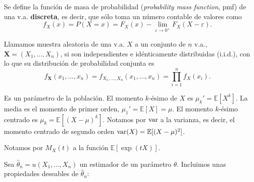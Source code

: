 \begin{definicion}
	Se define la función de masa de probabilidad  
(\textit{probability mass function}, pmf) de una v.a. 
\textbf{discreta}, es decir, que sólo toma un número contable 
de valores como
	\[ 
		f_X(x) = P(X=x) = 
		F_X(x) - 
			\lim_{\varepsilon \rightarrow 0^+} 
				F_X(X-\varepsilon).
	\]
\end{definicion}

\begin{definicion}
	Llamamos muestra aleatoria de una v.a. $X$ a un conjunto 
de $n$ v.a., $\mathbf{X} = (X_1, \dots, X_n)$, si son independientes e 
idénticamente distribuidas (i.i.d.), con lo que su 
distribución de probabilidad conjunta es
	\[ 
		f_{\mathbf{X}}(x_1, \dots, x_n) =
		f_{X_1, \dots, X_n}(x_1, \dots, x_n) =
		\prod\limits_{i=1}^n f_X(x_i).
	\]
\end{definicion}
	
\begin{definicion}[Momento]
	Es un parámetro de la población. El momento $k$-ésimo de 
$X$ es $\mu_k' = \mathbb{E}[X^k]$. La media es el momento de 
primer orden, $\mu_1' = \mathbb{E}[X] = \mu$. El momento 
$k$-ésimo centrado es  $\mu_k = \mathbb{E}[(X - \mu)^k]$.
Notamos por $\text{var}$ a la varianza, es decir, el momento 
centrado de segundo orden $\text{var}(X) = \mathbb{E}[(X - \mu)^2]$. 
\end{definicion}

\begin{definicion}
	Notamos por $M_{X}(t)$ a la función $\mathbb{E}[
\exp(tX)]$. 
\end{definicion}

	Sea $\hat{\theta}_n = u(X_1, \dots, X_n)$ un estimador de 
un parámetro $\theta$. Incluimos unas propiedades deseables 
de $\hat{\theta}_n$:
	
